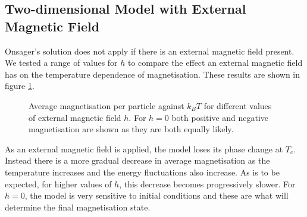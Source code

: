 \documentclass[11pt]{article}
\begin{document}
	\subsection{Two-dimensional Model with External Magnetic Field}
	
	Onsager's solution does not apply if there is an external magnetic field present. We tested a range of values for $h$ to compare the effect an external magnetic field has on the temperature dependence of magnetisation. These results are shown in figure \ref{fig:2d_mag_results}.
	\begin{figure}[H]
		\begin{center}
		\end{center}
		\caption{Average magnetisation per particle against $k_BT$ for different values of external magnetic field $h$. For $h=0$ both positive and negative magnetisation are shown as they are both equally likely.}
		\label{fig:2d_mag_results}
	\end{figure}
	As an external magnetic field is applied, the model loses its phase change at $T_c$. Instead there is a more gradual decrease in average magnetisation as the temperature increases and the energy fluctuations also increase. As is to be expected, for higher values of $h$, this decrease becomes progressively slower. For $h=0$, the model is very sensitive to initial conditions and these are what will determine the final magnetisation state. 
	
\end{document}
